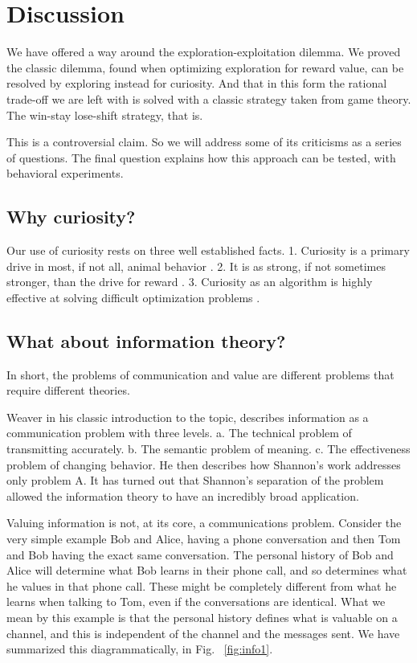 \section*{Discussion}
We have offered a way around the exploration-exploitation dilemma. We proved the classic dilemma, found when optimizing exploration for reward value, can be resolved by exploring instead for curiosity. And that in this form the rational trade-off we are left with is solved with a classic strategy taken from game theory. The win-stay lose-shift strategy, that is.

This is a controversial claim. So we will address some of its criticisms as a series of questions. The final question explains how this approach can be tested, with behavioral experiments. 

\subsection*{Why curiosity?}
Our use of curiosity rests on three well established facts. 1. Curiosity is a primary drive in most, if not all, animal behavior \cite{Inglis2001}. 2. It is as strong, if not sometimes stronger, than the drive for reward \cite{Loewenstein1994,Kidd2015,Gottlieb2018}. 3. Curiosity as an algorithm is highly effective at solving difficult optimization problems \cite{Schmidhuber1991,Pathak2017,Stanton2018,Lehman201,Mouret2011b1,Fister2019,Mouret2015,Colas2020,Cully2015,Pathak2017,Schwartenbeck2019.Laversanne-Finot2018}. 


\subsection*{What about information theory?}
In short, the problems of communication and value are different problems that require different theories.

Weaver \cite{Shannon1948} in his classic introduction to the topic, describes information as a communication problem with three levels. a. The technical problem of transmitting accurately. b. The semantic problem of meaning. c. The effectiveness problem of changing behavior. He then describes how Shannon's work addresses only problem A. It has turned out that Shannon's separation of the problem allowed the information theory to have an incredibly broad application. 

Valuing information is not, at its core, a communications problem. Consider the very simple example Bob and Alice, having a phone conversation and then Tom and Bob having the exact same conversation. The personal history of Bob and Alice will determine what Bob learns in their phone call, and so determines what he values in that phone call. These might be completely different from what he learns when talking to Tom, even if the conversations are identical. What we mean by this example is that the personal history defines what is valuable on a channel, and this is independent of the channel and the messages sent. We have summarized this diagrammatically, in Fig. ~\ref{fig:info1}.

